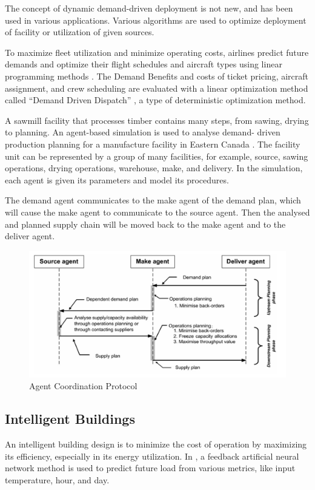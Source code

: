 The concept of dynamic demand-driven deployment is not new,
and has been used in various applications. Various algorithms
are used to optimize deployment of facility or utilization
of given sources.

To maximize fleet utilization and minimize
operating costs, airlines predict future demands
and optimize their flight schedules and aircraft
types using linear programming methods \cite{berge_demand_1993}. The Demand
Benefits and costs of ticket pricing, aircraft assignment, and crew 
scheduling are evaluated with a linear optimization method called
 ``Demand Driven Dispatch'' \cite{shebalov_practical_2009}, a type
of deterministic optimization method.

A sawmill facility that processes timber contains 
many steps, from sawing, drying to planning. An
agent-based simulation is used to analyse demand-
driven production planning for a manufacture facility
in Eastern Canada \cite{yanez_agent-based_2009}.
The facility unit can be represented by a group of many facilities,
for example, source, sawing operations, drying operations, warehouse,
make, and delivery. In the simulation, each agent is given its parameters
and model its procedures.

The demand agent communicates to the make agent of the demand plan,
which will cause the make agent to communicate to the source agent. Then the
analysed and planned supply chain will be moved back to the make agent and
to the deliver agent.

\begin{figure}
	\includegraphics[width=\textwidth]{./images/timber_process.png}
	\caption{Agent Coordination Protocol \cite{yanez_agent-based_2009} } 
	\label{fig:timber_process}
\end{figure}


\subsection{Intelligent Buildings}
An intelligent building design is to minimize 
the cost of operation by maximizing its efficiency,
especially in its energy utilization. In 
\cite{gonzalez_detailed_2002}, a feedback artificial neural
network method is used to predict future load from various
metrics, like input temperature, hour, and day.

